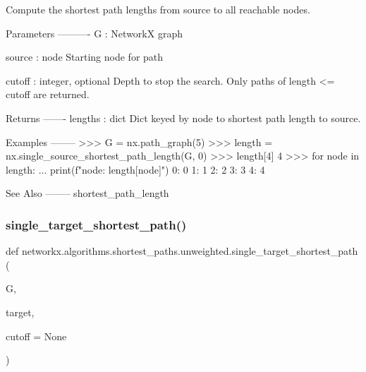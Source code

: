\begin{DoxyVerb}Compute the shortest path lengths from source to all reachable nodes.

Parameters
----------
G : NetworkX graph

source : node
   Starting node for path

cutoff : integer, optional
    Depth to stop the search. Only paths of length <= cutoff are returned.

Returns
-------
lengths : dict
    Dict keyed by node to shortest path length to source.

Examples
--------
>>> G = nx.path_graph(5)
>>> length = nx.single_source_shortest_path_length(G, 0)
>>> length[4]
4
>>> for node in length:
...     print(f"{node}: {length[node]}")
0: 0
1: 1
2: 2
3: 3
4: 4

See Also
--------
shortest_path_length
\end{DoxyVerb}
 \mbox{\label{namespacenetworkx_1_1algorithms_1_1shortest__paths_1_1unweighted_a0a81a0f62206e34a3087502c69041446}} 
\subsubsection{\texorpdfstring{single\+\_\+target\+\_\+shortest\+\_\+path()}{single\_target\_shortest\_path()}}
{\footnotesize\ttfamily def networkx.\+algorithms.\+shortest\+\_\+paths.\+unweighted.\+single\+\_\+target\+\_\+shortest\+\_\+path (\begin{DoxyParamCaption}\item[{}]{G,  }\item[{}]{target,  }\item[{}]{cutoff = {\ttfamily None} }\end{DoxyParamCaption})}

